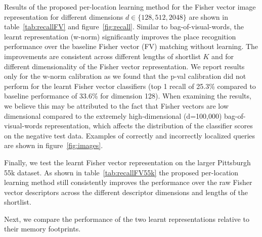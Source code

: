     Results of the proposed per-location learning method for the Fisher vector image representation for different dimensions $d\in\{128, 512, 2048\}$ 
    are shown in table~\ref{tab:recallFV} and figure~\ref{fig:recall}.
    Similar to bag-of-visual-words, the learnt representation (w-norm) significantly improves the place recognition performance over the baseline Fisher vector (FV) matching without learning. The improvements are consistent across different lengths of shortlist $K$ and for different dimensionality of the Fisher vector representation. 
    We report results only for the w-norm calibration as we found that the p-val calibration did not perform for the learnt Fisher vector classifiers (top 1 recall of 25.3\% compared to baseline performance of 33.6\% for dimension 128). When examining the results, we believe this may be attributed to the fact that Fisher vectors are low dimensional compared to the extremely high-dimensional (d=100,000) bag-of-visual-words representation, which affects the distribution of the classifier scores on the negative test data. 
    Examples of correctly and incorrectly localized queries are shown in figure~\ref{fig:images}. 
    
        Finally, we test the learnt Fisher vector representation on the larger Pittsburgh 55k dataset. As shown in table~\ref{tab:recallFV55k} the proposed per-location learning method still consistently improves the performance over the raw Fisher vector descriptors across the different descriptor dimensions and lengths of the shortlist. 

\noindent
        Next, we compare the performance of the two learnt representations relative to their memory footprints.  

